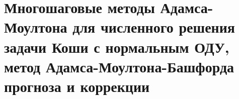 \documentclass[__main__.tex]{subfiles}
\begin{document}
\section{Многошаговые методы Адамса-Моултона для численного решения задачи Коши с нормальным ОДУ, метод Адамса-Моултона-Башфорда прогноза и коррекции}
\end{document}
